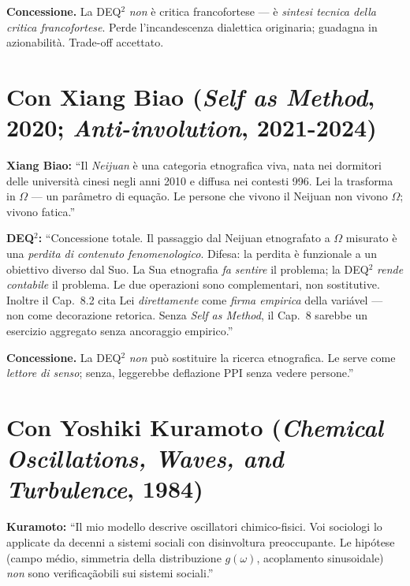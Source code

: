 \textbf{Concessione.} La DEQ$^2$ \emph{non} è critica francofortese --- è
\emph{sintesi tecnica della critica francofortese}. Perde
l'incandescenza dialettica originaria; guadagna in azionabilità.
Trade-off accettato.



\section{\texorpdfstring{Con Xiang Biao (\emph{Self as Method}, 2020;
\emph{Anti-involution},
2021-2024)}{Con Xiang Biao (Self as Method, 2020; Anti-involution, 2021-2024)}}\label{con-xiang-biao-self-as-method-2020-anti-involution-2021-2024}

\textbf{Xiang Biao:} ``Il \emph{Neijuan} è una categoria etnografica
viva, nata nei dormitori delle università cinesi negli anni 2010 e
diffusa nei contesti 996. Lei la trasforma in \(\Omega\) --- un
parâmetro di equação. Le persone che vivono il Neijuan non vivono
\(\Omega\); vivono fatica.''

\textbf{DEQ$^2$:} ``Concessione totale. Il passaggio dal Neijuan
etnografato a \(\Omega\) misurato è una \emph{perdita di contenuto
fenomenologico}. Difesa: la perdita è funzionale a un obiettivo diverso
dal Suo. La Sua etnografia \emph{fa sentire} il problema; la DEQ$^2$
\emph{rende contabile} il problema. Le due operazioni sono
complementari, non sostitutive. Inoltre il Cap.~8.2 cita Lei
\emph{direttamente} come \emph{firma empirica} della variável --- non
come decorazione retorica. Senza \emph{Self as Method}, il Cap.~8
sarebbe un esercizio aggregato senza ancoraggio empirico.''

\textbf{Concessione.} La DEQ$^2$ \emph{non} può sostituire la ricerca
etnografica. Le serve come \emph{lettore di senso}; senza, leggerebbe
deflazione PPI senza vedere persone.''



\section{\texorpdfstring{Con Yoshiki Kuramoto (\emph{Chemical
Oscillations, Waves, and Turbulence},
1984)}{Con Yoshiki Kuramoto (Chemical Oscillations, Waves, and Turbulence, 1984)}}\label{con-yoshiki-kuramoto-chemical-oscillations-waves-and-turbulence-1984}

\textbf{Kuramoto:} ``Il mio modello descrive oscillatori chimico-fisici.
Voi sociologi lo applicate da decenni a sistemi sociali con disinvoltura
preoccupante. Le hipótese (campo médio, simmetria della distribuzione
\(g(\omega)\), acoplamento sinusoidale) \emph{non} sono verificaçãobili
sui sistemi sociali.''

